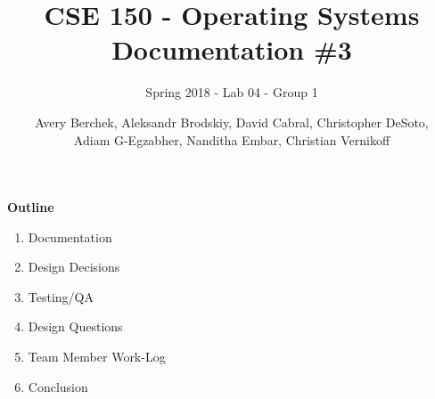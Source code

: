 \documentclass[12pt]{article}
\title{CSE 150 - Operating Systems \\ Documentation \#3}
\subtitle{Spring 2018 - Lab 04 - Group 1}
\author{Avery Berchek, Aleksandr Brodskiy, David Cabral, Christopher DeSoto,\\Adiam G-Egzabher, Nanditha Embar, Christian Vernikoff}
\begin{document}
\maketitle
{\setlength{\parindent}{0cm}
\textbf{Outline}
\begin{enumerate}  
\item Documentation
\item Design Decisions
\item Testing/QA
\item Design Questions
\item Team Member Work-Log
\item Conclusion\\\\\\\\\\\\\\\\\\\\
\end{enumerate} 
}
\end{document}
